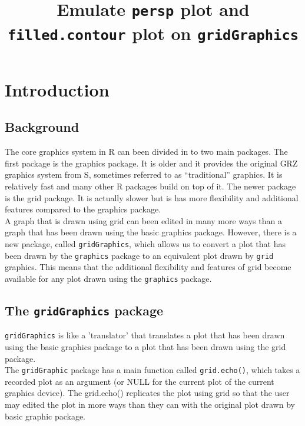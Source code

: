 \documentclass[paper=a4, fontsize=11pt]{report}
\begin{document}

\setlength{\parindent}{0}
\noindent

\title{Emulate \texttt{persp} plot and \texttt{filled.contour} plot on \texttt{gridGraphics}}
\maketitle
\chapter{Introduction}
\section{Background}
The core graphics system in R can been divided in to two main packages. The first package is the graphics package. It is older and it provides the original GRZ graphics system from S, sometimes referred to as ``traditional'' graphics. It is relatively fast and many other R packages build on top of it. The newer package is the grid package. It is actually slower but is has more flexibility and additional features compared to the graphics package. \\

A graph that is drawn using grid can been edited in many more ways than a graph that has been drawn using the basic graphics package. However, there is a new package, called \texttt{gridGraphics}, which allows us to convert a plot that has been drawn by the \texttt{graphics} package to an equivalent plot drawn by \texttt{grid} graphics. This means that the additional flexibility and features of grid become available for any plot drawn using the \texttt{graphics} package. \\

\section{The \texttt{gridGraphics} package}
\texttt{gridGraphics} is like a 'translator' that translates a plot that has been drawn using the basic graphics package to a plot that has been drawn using the grid package. \\

The \texttt{gridGraphic} package has a main function called \texttt{grid.echo()}, which takes a recorded plot as an argument (or NULL for the current plot of the current graphics device). The grid.echo() replicates the plot using grid so that the user may edited the plot in more ways than they can with the original plot drawn by basic graphic package.\\
\end{document}
